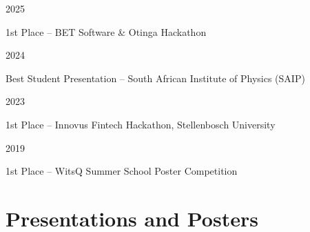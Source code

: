 \documentclass[9pt]{extreport}
\newcommand{\entry}[2]{%
  \noindent%
  \begin{minipage}[t]{2.25cm}%
    \raggedright #1%
  \end{minipage}%
  \hspace{0.4cm}%
  \begin{minipage}[t]{\dimexpr\textwidth-2cm\relax}%
    #2%
  \end{minipage}%
  \vspace{0.25cm}%
}
\begin{document}
\entry{2025}{1st Place -- BET Software \& Otinga Hackathon}

\entry{2024}{Best Student Presentation -- South African Institute of Physics (SAIP)}

\entry{2023}{1st Place -- Innovus Fintech Hackathon, Stellenbosch University}

\entry{2019}{1st Place -- WitsQ Summer School Poster Competition}









\section*{Presentations and Posters}
\end{document}
